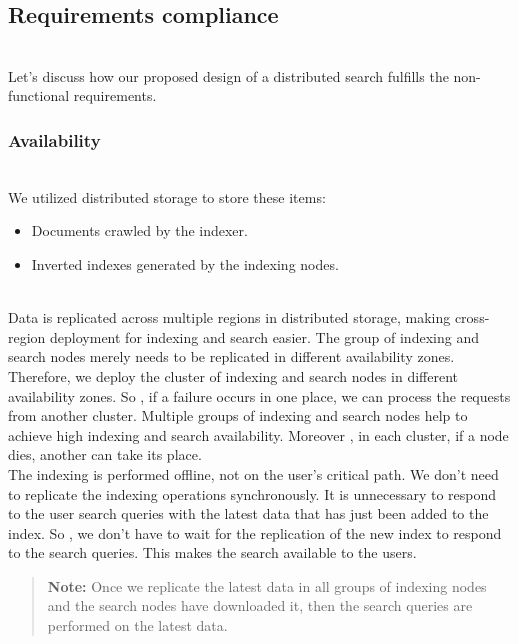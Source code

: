 

\subsection{Requirements compliance}\label{_sb-_cCbIB_-wveiRJU9A}
\\
Let's discuss how our proposed design of a distributed search fulfills the non-functional requirements.

\subsubsection{Availability}\label{cWeRoe4bMVy-4c80Zi8Q1}
\\
We utilized distributed storage to store these items:

\begin{itemize}
\item
\protect{}\label{pv00IRde78aqPIXBatl7U}
Documents crawled by the indexer.
\item
\protect{}\label{MtEzEckuMEcdTMGQfGoOo}
Inverted indexes generated by the indexing nodes.
\end{itemize}
\\
Data is replicated across multiple regions in distributed storage, making cross-region deployment for indexing and search easier. The group of indexing and search nodes merely needs to be replicated in different availability zones. Therefore, we deploy the cluster of indexing and search nodes in different availability zones. So , if a failure occurs in one place, we can process the requests from another cluster. Multiple groups of indexing and search nodes help to achieve high indexing and search availability. Moreover
, in each cluster, if a node dies, another can take its place.
\\
The indexing is performed offline, not on the user's critical path. We don't need to replicate the indexing operations synchronously. It is unnecessary to respond to the user search queries with the latest data that has just been added to the index. So , we don't have to wait for the replication of the new index to respond to the search queries. This makes the search available to the users.
\begin{quote}
\textbf{Note:} Once we replicate the latest data in all groups of indexing nodes and the search nodes have downloaded it, then the search queries are performed on the latest data.
\end{quote}

